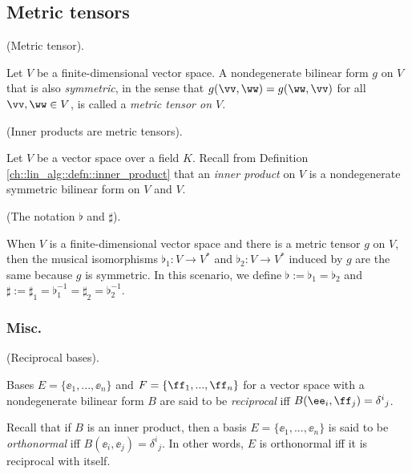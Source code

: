 \subsection*{Metric tensors}

\begin{defn}
    (Metric tensor).
    
    Let $V$ be a finite-dimensional vector space. A nondegenerate bilinear form $g$ on $V$ that is also \textit{symmetric}, in the sense that $g(\vv, \ww) = g(\ww, \vv)$ for all $\vv, \ww \in V$, is called a \textit{metric tensor on $V$}.
\end{defn}

\begin{remark}
    (Inner products are metric tensors).
    
    Let $V$ be a vector space over a field $K$. Recall from Definition     \ref{ch::lin_alg::defn::inner_product} that an \textit{inner product} on $V$ is a nondegenerate symmetric bilinear form on $V$ and $V$.
\end{remark}

\begin{defn}
    (The notation $\flat$ and $\sharp$).
    
    When $V$ is a finite-dimensional vector space and there is a metric tensor $g$ on $V$, then the musical isomorphisms ${\flat_1:V \rightarrow V^*}$ and ${\flat_2:V \rightarrow V^*}$ induced by $g$ are the same because $g$ is symmetric. In this scenario, we define $\flat := \flat_1 = \flat_2$ and $\sharp := \sharp_1 = \flat_1^{-1} = \sharp_2 = \flat_2^{-1}$.
\end{defn}

\subsubsection*{Misc.}

\begin{defn}
    (Reciprocal bases).

    Bases $E = \{\ee_1, ..., \ee_n\}$ and $F = \{\ff_1, ..., \ff_n\}$ for a vector space with a nondegenerate bilinear form $B$ are said to be \textit{reciprocal} iff $B(\ee_i, \ff_j) = \delta^i{}_j$.

    Recall that if $B$ is an inner product, then a basis $E = \{\ee_1, ..., \ee_n\}$ is said to be \textit{orthonormal} iff $B(\ee_i, \ee_j) = \delta^i{}_j$. In other words, $E$ is orthonormal iff it is reciprocal with itself.
\end{defn}

